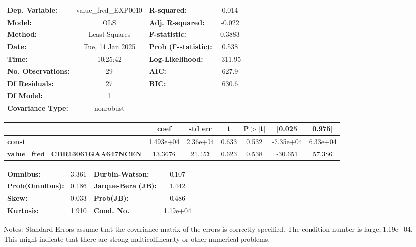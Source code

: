 \begin{center}
\begin{tabular}{lclc}
\toprule
\textbf{Dep. Variable:}                  & value\_fred\_EXP0010 & \textbf{  R-squared:         } &     0.014   \\
\textbf{Model:}                          &         OLS          & \textbf{  Adj. R-squared:    } &    -0.022   \\
\textbf{Method:}                         &    Least Squares     & \textbf{  F-statistic:       } &    0.3883   \\
\textbf{Date:}                           &   Tue, 14 Jan 2025   & \textbf{  Prob (F-statistic):} &    0.538    \\
\textbf{Time:}                           &       10:25:42       & \textbf{  Log-Likelihood:    } &   -311.95   \\
\textbf{No. Observations:}               &            29        & \textbf{  AIC:               } &     627.9   \\
\textbf{Df Residuals:}                   &            27        & \textbf{  BIC:               } &     630.6   \\
\textbf{Df Model:}                       &             1        & \textbf{                     } &             \\
\textbf{Covariance Type:}                &      nonrobust       & \textbf{                     } &             \\
\bottomrule
\end{tabular}
\begin{tabular}{lcccccc}
                                         & \textbf{coef} & \textbf{std err} & \textbf{t} & \textbf{P$> |$t$|$} & \textbf{[0.025} & \textbf{0.975]}  \\
\midrule
\textbf{const}                           &    1.493e+04  &     2.36e+04     &     0.633  &         0.532        &    -3.35e+04    &     6.33e+04     \\
\textbf{value\_fred\_CBR13061GAA647NCEN} &      13.3676  &       21.453     &     0.623  &         0.538        &      -30.651    &       57.386     \\
\bottomrule
\end{tabular}
\begin{tabular}{lclc}
\textbf{Omnibus:}       &  3.361 & \textbf{  Durbin-Watson:     } &    0.107  \\
\textbf{Prob(Omnibus):} &  0.186 & \textbf{  Jarque-Bera (JB):  } &    1.442  \\
\textbf{Skew:}          &  0.033 & \textbf{  Prob(JB):          } &    0.486  \\
\textbf{Kurtosis:}      &  1.910 & \textbf{  Cond. No.          } & 1.19e+04  \\
\bottomrule
\end{tabular}
\end{center}

Notes: \newline
 [1] Standard Errors assume that the covariance matrix of the errors is correctly specified. \newline
 [2] The condition number is large, 1.19e+04. This might indicate that there are \newline
 strong multicollinearity or other numerical problems.